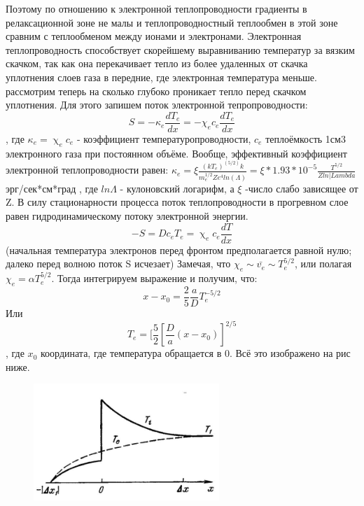 \documentclass[10pt, a4paper]{article}
\begin{document}
Поэтому по отношению к электронной теплопроводности градиенты в релаксационной зоне не малы и теплопроводностный теплообмен в этой зоне сравним с теплообменом между ионами и электронами. Электронная теплопроводность способствует скорейшему выравниванию температур за вязким скачком, так как она перекачивает тепло из более удаленных от скачка уплотнения слоев газа в передние, где электронная температура меньше. 
рассмотрим теперь на сколько глубоко проникает тепло перед скачком уплотнения.
Для этого запишем поток электронной тепропроводности:
\begin{equation}
	S=-\kappa_e \frac{dT_e}{dx}=-\chi_e c_e \frac{dT_e}{dx}
\end{equation}
, где $\kappa_e = \upchi_e c_e$ - коэффициент температуропроводности, $c_e$ теплоёмкость 1см3 электронного газа при постоянном объёме.
Вообще, эффективный коэффициент электронной теплопроводности равен:
$\kappa_e = \xi \frac{(kT_e)^(5/2) k}{m_e^{1/2} Z e^{4} ln(\Lambda)} = \xi *1.93*10^{-5}\frac{T^{5/2}}{Z ln|Lambda} $ эрг/сек*см*град
, где $ln\Lambda$ - кулоновский логарифм, а $\xi$ -число слабо зависящее от Z.
В силу стационарности процесса поток теплопроводности в прогревном слое равен гидродинамическому потоку электронной энергии.
\begin{equation}
	-S= D c_e T_e = \upchi_e c_e \frac{dT}{dx}
\end{equation}
(начальная температура электронов перед фронтом предполагается равной нулю; далеко перед волною поток S исчезает)
Замечая, что $\chi_e \sim \bar{v_e} \sim T_e^{5/2} $, или полагая $\chi_e=\alpha T_e^{5/2}$. Тогда интегрируем выражение и получим, что:
\begin{equation}
	x-x_0 = \frac{2}{5} \frac{a}{D} T_e^{-5/2}
\end{equation}
Или 
\begin{equation}
	T_e = [\frac{5}{2} [\frac{D}{a} (x-x_0) ]^{2/5}
\end{equation}
, где $x_0$ координата, где температура обращается в 0. Всё это изображено на рис ниже.

\begin{figure}[h!]
	\begin{center}
		\includegraphics[width=70mm]{13. teploprov.JPG}
	\end{center}
\end{figure}
\end{document}
